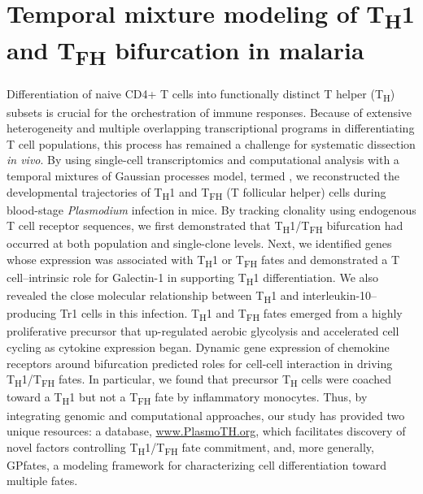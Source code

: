 
\chapter{Temporal mixture modeling of \texorpdfstring{T\textsubscript{H}\textnormal{1} and T\textsubscript{FH}}{TH1 and TFH} bifurcation in malaria} \label{ch:malaria}

\graphicspath{{Chapter4/Figs/}}

Differentiation of na{i}ve CD4+ T cells into functionally distinct T helper (T\textsubscript{H}) subsets is crucial for the orchestration of immune responses. Because of extensive heterogeneity and multiple overlapping transcriptional programs in differentiating T cell populations, this process has remained a challenge for systematic dissection \textit{in vivo}. By using single-cell transcriptomics and computational analysis with a temporal mixtures of Gaussian processes model, termed , we reconstructed the developmental trajectories of T\textsubscript{H}1 and T\textsubscript{FH} (T follicular helper) cells during blood-stage \textit{Plasmodium} infection in mice. By tracking clonality using endogenous T cell receptor sequences, we first demonstrated that T\textsubscript{H}1/T\textsubscript{FH} bifurcation had occurred at both population and single-clone levels. Next, we identified genes whose expression was associated with T\textsubscript{H}1 or T\textsubscript{FH} fates and demonstrated a T cell–intrinsic role for Galectin-1 in supporting T\textsubscript{H}1 differentiation. We also revealed the close molecular relationship between T\textsubscript{H}1 and interleukin-10–producing Tr1 cells in this infection. T\textsubscript{H}1 and T\textsubscript{FH} fates emerged from a highly proliferative precursor that up-regulated aerobic glycolysis and accelerated cell cycling as cytokine expression began. Dynamic gene expression of chemokine receptors around bifurcation predicted roles for cell-cell interaction in driving T\textsubscript{H}1/T\textsubscript{FH} fates. In particular, we found that precursor T\textsubscript{H} cells were coached toward a T\textsubscript{H}1 but not a T\textsubscript{FH} fate by inflammatory monocytes. Thus, by integrating genomic and computational approaches, our study has provided two unique resources: a database, \url{www.PlasmoTH.org}, which facilitates discovery of novel factors controlling T\textsubscript{H}1/T\textsubscript{FH} fate commitment, and, more generally, GPfates, a modeling framework for characterizing cell differentiation toward multiple fates.


